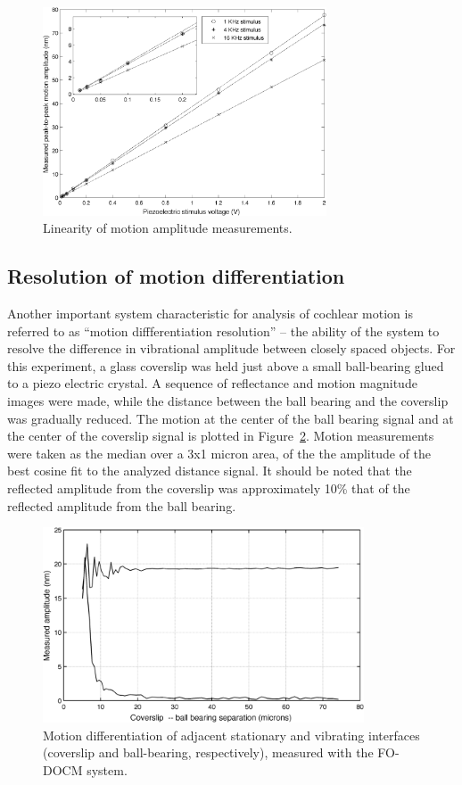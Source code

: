 \begin{figure}[h!]
\centering
\includegraphics[width=0.75\textwidth]{Images/Results/motion_linearity.png}
\caption{Linearity of motion amplitude measurements.\label{fig:motion_linearity}}
\end{figure}

\subsection{Resolution of motion differentiation}

Another important system characteristic for analysis of cochlear motion is referred to as ``motion diffferentiation resolution'' -- the ability of the system to resolve the difference in vibrational amplitude between closely spaced objects. For this experiment, a glass coverslip was held just above a small ball-bearing glued to a piezo electric crystal. A sequence of reflectance and motion magnitude images were made, while the distance between the ball bearing and the coverslip was gradually reduced. The motion at the center of the ball bearing signal and at the center of the coverslip signal is plotted in Figure~\ref{fig:diff}. Motion measurements were taken as the median over a 3x1 micron area, of the the amplitude of the best cosine fit to the analyzed distance signal. It should be noted that the reflected amplitude from the coverslip was approximately 10\% that of the reflected amplitude from the ball bearing.

\begin{figure}[h!]
\centering
\includegraphics[width=0.85\textwidth]{Images/Results/differentiation.png}
\caption{Motion differentiation of adjacent stationary and vibrating interfaces (coverslip and ball-bearing, respectively), measured with the FO-DOCM system.\label{fig:diff}}
\end{figure}

